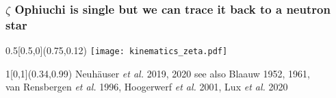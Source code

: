 \documentclass[xcolor=dvipsnames,professionalfonts, aspectratio=169]{beamer}
\begin{document}
\begin{frame}
  \frametitle{\textcolor{whiteish}{$\zeta$ Ophiuchi is single but we can trace it back to a neutron star}}

  \begin{textblock}{0.5}[0.5,0](0.75,0.12)
    \texttt{[image: kinematics\_zeta.pdf]}
  \end{textblock}




  \begin{textblock}{1}[0,1](0.34,0.99)
    \textcolor{gray!50}{\tiny Neuh\"auser \emph{et al.} 2019, 2020 see
      also Blaauw 1952, 1961,\\[-7pt]
      van Rensbergen \emph{et al.} 1996,
      Hoogerwerf \emph{et al.} 2001, Lux \emph{et al.} 2020}\hfill\,
  \end{textblock}

\end{frame}
\egroup
\end{document}
